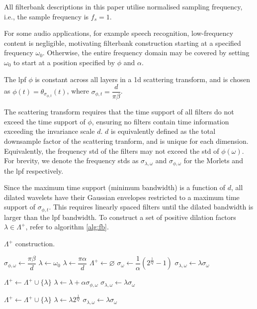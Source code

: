 All filterbank descriptions in this paper utilise normalised sampling frequency, i.e., the sample frequency is $f_s = 1$.

For some audio applications, for example speech recognition, low-frequency content is negligible, motivating filterbank construction starting at a specified frequency $\omega_0$. Otherwise, the entire frequency domain may be covered by setting $\omega_0$ to start at a position specified by $\phi$ and $\alpha$.

The \ac{lpf} $\phi$ is constant across all layers in a \ac{1d} scattering transform, and is chosen as $\phi(t) = \theta_{\sigma_{\phi, t}}(t)$, where $\sigma_{\phi, t} = \dfrac{d}{ \pi \beta}$.

The scattering transform requires that the time support of all filters do not exceed the time support of $\phi$, ensuring no filters contain time information exceeding the invariance scale $d$. $d$ is equivalently defined as the total downsample factor of the scattering tranform, and is unique for each dimension. Equivalently, the frequency \ac{std} of the filters may not exceed the \ac{std} of $\phi(\omega)$. For brevity, we denote the frequency \ac{std}s as $\sigma_{\lambda, \omega}$ and $\sigma_{\phi, \omega}$ for the Morlets and the \ac{lpf} respectively. 

 Since the maximum time support (minimum bandwidth) is a function of $d$, all dilated wavelets have their Gaussian envelopes restricted to a maximum time support of $\sigma_{\phi, t}$. This requires linearly spaced filters until the dilated bandwidth is larger than the \ac{lpf} bandwidth. To construct a set of positive dilation factors $\lambda \in \Lambda^+$, refer to algorithm \ref{alg:fb}.

\begin{algorithm}    
\caption{$\Lambda^+$ construction.}\label{alg:fb}
\begin{algorithmic}
    \State $\sigma_{\phi, \omega} \gets \dfrac{\pi\beta}{d}$
        \State $\lambda \gets \omega_0$
    \Else{}
        \State $\lambda \gets \dfrac{\pi\alpha}{d}$
    \EndIf
    \State $\Lambda^+ \gets \varnothing$
    \State $\sigma_\omega \gets \dfrac{1}{\alpha}\left( 2^\frac{1}{Q} - 1 \right)$
    \State $\sigma_{\lambda, \omega} \gets \lambda\sigma_\omega$
    
        \State $\Lambda^+ \gets \Lambda^+ \cup \{\lambda\}$
        \State $\lambda \gets \lambda + \alpha \sigma_{\phi, \omega}$ 
        \State $\sigma_{\lambda, \omega} \gets \lambda\sigma_\omega$
    \EndWhile
    
    \While{$\lambda < \pi$}
        \State $\Lambda^+ \gets \Lambda^+ \cup \{\lambda\}$
        \State $\lambda \gets \lambda 2^{\frac{1}{Q}}$
        \State $\sigma_{\lambda, \omega} \gets \lambda\sigma_\omega$
    \EndWhile
\end{algorithmic}
\end{algorithm}

